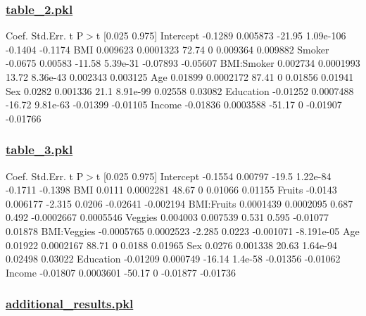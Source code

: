 \documentclass[11pt]{article}
\begin{document}
\subsubsection*{\hyperlink{code-Data Analysis-table-2-pkl}{table\_2.pkl}}

\begin{codeoutput}
              Coef.  Std.Err.      t      P$>$\textbar{}t\textbar{}   [0.025   0.975]
Intercept   -0.1289  0.005873 -21.95  1.09e-106  -0.1404  -0.1174
BMI        0.009623 0.0001323  72.74          0 0.009364 0.009882
Smoker      -0.0675   0.00583 -11.58   5.39e-31 -0.07893 -0.05607
BMI:Smoker 0.002734 0.0001993  13.72   8.36e-43 0.002343 0.003125
Age         0.01899 0.0002172  87.41          0  0.01856  0.01941
Sex          0.0282  0.001336   21.1   8.91e-99  0.02558  0.03082
Education  -0.01252 0.0007488 -16.72   9.81e-63 -0.01399 -0.01105
Income     -0.01836 0.0003588 -51.17          0 -0.01907 -0.01766
\end{codeoutput}\hypertarget{file-table-3-pkl}{}

\subsubsection*{\hyperlink{code-Data Analysis-table-3-pkl}{table\_3.pkl}}

\begin{codeoutput}
                 Coef.  Std.Err.      t     P$>$\textbar{}t\textbar{}     [0.025     0.975]
Intercept      -0.1554   0.00797  -19.5  1.22e-84    -0.1711    -0.1398
BMI             0.0111 0.0002281  48.67         0    0.01066    0.01155
Fruits         -0.0143  0.006177 -2.315    0.0206   -0.02641  -0.002194
BMI:Fruits   0.0001439 0.0002095  0.687     0.492 -0.0002667  0.0005546
Veggies       0.004003  0.007539  0.531     0.595   -0.01077    0.01878
BMI:Veggies -0.0005765 0.0002523 -2.285    0.0223  -0.001071 -8.191e-05
Age            0.01922 0.0002167  88.71         0     0.0188    0.01965
Sex             0.0276  0.001338  20.63  1.64e-94    0.02498    0.03022
Education     -0.01209  0.000749 -16.14   1.4e-58   -0.01356   -0.01062
Income        -0.01807 0.0003601 -50.17         0   -0.01877   -0.01736
\end{codeoutput}\hypertarget{file-additional-results-pkl}{}

\subsubsection*{\hyperlink{code-Data Analysis-additional-results-pkl}{additional\_results.pkl}}
\end{document}

